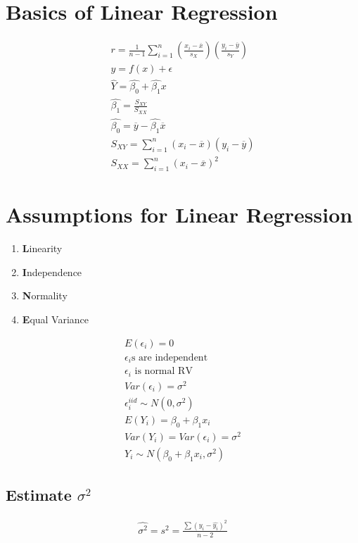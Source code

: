 \section{Basics of Linear Regression}
\begin{align}
  r = \frac{1}{n-1} \sum_{i=1}^n \left( \frac{x_i - \overbar{x}}{s_X}  \right) \left( \frac{y_i - \overbar{y}}{s_Y}  \right) \\
  y = f(x) + \epsilon \\
  \hat{Y} = \hat{\beta_0} + \hat{\beta_1}x \\
  \hat{\beta_1} = \frac{S_{XY}}{S_{XX}} \\
  \hat{\beta_0} = \overbar{y} - \hat{\beta_1}\overbar{x} \\
  S_{XY} = \sum_{i=1}^n (x_i - \overbar{x})(y_i - \overbar{y}) \\
  S_{XX} = \sum_{i=1}^n (x_i - \overbar{x})^2
\end{align}

\section{Assumptions for Linear Regression}
\begin{enumerate}
\item \textbf{L}inearity
\item \textbf{I}ndependence
\item \textbf{N}ormality
\item \textbf{E}qual Variance
\end{enumerate}

\begin{align}
  E(\epsilon_i) = 0 \\
  \text{$\epsilon_i$s are independent} \\
  \text{$\epsilon_i$ is normal RV} \\
  Var(\epsilon_i) = \sigma^2 \\
  \epsilon_i^{iid} \sim N(0, \sigma^2) \\
  E(Y_i) = \beta_0 + \beta_1x_i \\
  Var(Y_i) = Var(\epsilon_i) = \sigma^2 \\
  Y_i \sim N(\beta_0 + \beta_1x_i, \sigma^2)
\end{align}

\subsection{Estimate $\sigma^2$}
\begin{align}
  \hat{\sigma^2} = s^2 = \frac{\sum (y_i - \hat{y_i})^2}{n-2}
\end{align}

